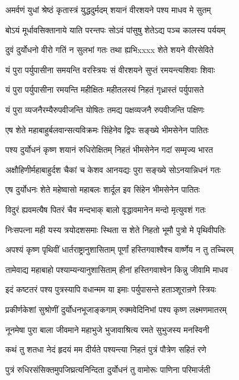 \twolineshloka
{अमर्वणं युधां श्रेष्ठं कृतास्त्रं युद्धदुर्मदम्}
{शयानं वीरशयने पश्य माधव मे सुतम्}


\twolineshloka
{बोऽयं मूर्धावसिक्तानाये याति परन्तपः}
{सोऽवं पांसुषु शेतेऽद्य पञ्च कालस्य पर्ययम्}


\twolineshloka
{दुवं दुर्योधनो वीरो गतिं न सुलभां गतः}
{तथा ह्यभिxxxx शेते शयने वीरसेविते}


\twolineshloka
{यं पुरा पर्युपासीना समयन्ति वरस्त्रियः}
{सं वीरशयने सुप्तं रमयन्त्यशिवाः शिवाः}


\twolineshloka
{यं पुरा पर्युपासीना रमयन्ति महीक्षितः}
{महीतलस्यं निहतं गृध्रास्तं पर्युपासते}


\twolineshloka
{यं पुरा व्यजनैरम्यैरुपवीजन्ति योषितः}
{तमद्य पक्षव्यजनै रुपवीजन्ति पक्षिणः}


\twolineshloka
{एष शेते महाबाहुर्बलवान्सत्यविक्रमः}
{सिंहेनेव द्विपः सङ्ख्ये भीमसेनेन पातितः}


\twolineshloka
{पश्य दुर्योधनं कृष्ण शयानं रुधिरोक्षितम्}
{निहतं भीमसेनेन गदां सम्मृज्य भारत}


\twolineshloka
{अक्षौहिणीर्महाबाहुर्दश चैकां च केशव}
{आनयद्यः पुरा सङ्ख्ये सोऽनयान्निधनं गतः}


\twolineshloka
{एष दुर्योधनः शेते महेष्वासो महाबलः}
{शार्दूल इव सिंहेन भीमसेनेन पातितः}


\twolineshloka
{विदुरं ह्यवमत्यैष पितरं चैव मन्दभाक्}
{बालो वृद्धावमानेन मन्दो मृत्युवशं गतः}


\twolineshloka
{निःसपत्ना मही यस्य त्रयोदशसमाः स्थिता}
{स शेते निहतो भूमौ पुत्रो मे पृथिवीपतिः}


\twolineshloka
{अपश्यं कृष्ण पृथिवीं धार्तराष्ट्रानुशासिताम्}
{पूर्णां हस्तिगवाश्वैश्च वार्ष्णेय न तु तच्चिरम्}


\twolineshloka
{तामेवाद्य महाबाहो पश्याम्यन्यानुशासिताम्}
{हीनां हस्तिगवाश्वेन किन्नु जीवामि माधव}


\twolineshloka
{इदं कष्टतरं पश्य पुत्रस्यापि वधान्मम}
{या इमाः पर्युपासन्ते हताञ्शूरान्रणे स्त्रियः}


\twolineshloka
{प्रकीर्णकेशां सुश्रोणीं दुर्योधनभूजाङ्कगाम्}
{रुक्मवेदिनिभां पश्य कृष्ण लक्ष्मणमातरम्}


\twolineshloka
{नूनमेषा पुरा बाला जीवमाने महाभुजे}
{भुजावाश्रित्य रमते सुभुजस्य मनस्विनी}


\twolineshloka
{कथं तु शतधा नेदं हृदयं मम दीर्यते}
{पश्यन्त्या निहतं पुत्रं पौत्रेण सहितं रणे}


\twolineshloka
{पुत्रं रुधिरसंसिक्तमुपजिघ्रत्यनिन्दिता}
{दुर्योधनं तु वामोरूः पाणिना परिमार्जती}


